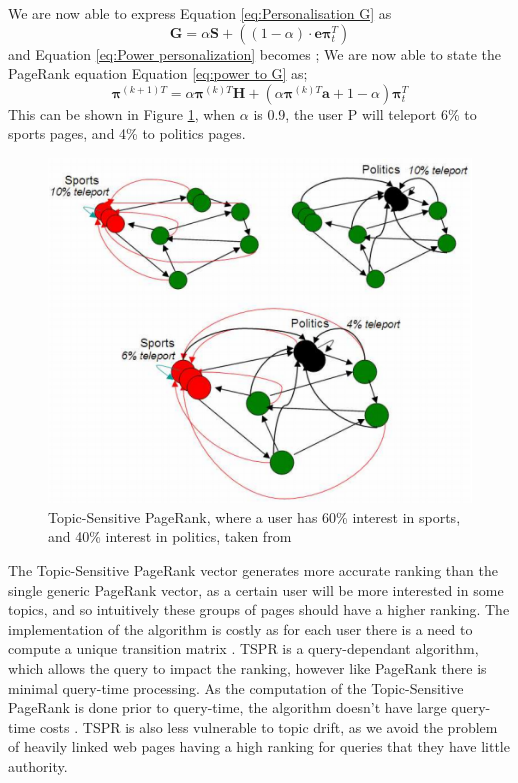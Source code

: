 \documentclass[11pt]{report}
\begin{document}
We are now able to express Equation \eqref{eq:Personalisation G} as 
\begin{equation*}\label{eq:TSPR G}
\textbf{G}=\alpha\textbf{S}+\left((1-\alpha)\cdot\textbf{e}\boldsymbol{\pi}_t^T\right)
\end{equation*} 
and Equation \eqref{eq:Power personalization} becomes ; We are now able to state the PageRank equation Equation \eqref{eq:power to G} as; 
\begin{equation*}
\boldsymbol{\pi}^{(k+1)T} = \alpha\boldsymbol{\pi}^{(k)T}\textbf{H} + \left(\alpha\boldsymbol{\pi}^{(k)T}\textbf{a} + 1 - \alpha\right)\boldsymbol{\pi}_t^T \label{eq:TSPR power}
\end{equation*} This can be shown in Figure \ref{fig:topic-specific}, when $\alpha$ is 0.9, the user P will teleport 6\% to sports pages, and 4\% to politics pages.

\begin{figure}[h]
\centering
\includegraphics[width=0.75\linewidth]{Topic-specific_PageRank_Manning.png}
\caption{Topic-Sensitive PageRank, where a user has 60\% interest in sports, and 40\% interest in politics, taken from \cite{manning}}
\label{fig:topic-specific}\end{figure}

The Topic-Sensitive PageRank vector generates more accurate ranking than the single generic PageRank vector, as a certain user will be more interested in some topics, and so intuitively these groups of pages should have a higher ranking. The implementation of the algorithm is costly as for each user there is a need to compute a unique transition matrix \cite{manning}. TSPR is a query-dependant algorithm, which allows the query to impact the ranking, however like PageRank there is minimal query-time processing. As the computation of the Topic-Sensitive PageRank is done prior to query-time, the algorithm doesn't have large query-time costs \cite{haveliwala2002topic}. TSPR is also less vulnerable to topic drift, as we avoid the problem of heavily linked web pages having a high ranking for queries that they have little authority. 
\end{document}
